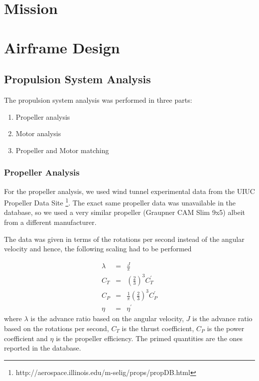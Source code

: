 \documentclass[11pt]{article}
\begin{document}
\section{Mission}
\label{Mission}

\section{Airframe Design}
\label{Vehicle}

\subsection{Propulsion System Analysis}

The propulsion system analysis was performed in three parts:
\begin{enumerate}
\item Propeller analysis
\item Motor analysis
\item Propeller and Motor matching
\end{enumerate}

\subsubsection{Propeller Analysis}

For the propeller analysis, we used wind tunnel experimental data from the UIUC Propeller Data Site \footnote{http://aerospace.illinois.edu/m-selig/props/propDB.html}. The exact same propeller data was unavailable in the database, so we used a very similar propeller (Graupner CAM Slim 9x5) albeit from a different manufacturer.

The data was given in terms of the rotations per second instead of the angular velocity and hence, the following scaling had to be performed

\begin{eqnarray*}
\lambda &=& \frac{J}{\pi} \\
C_T &=& \left( \frac{2}{3} \right)^3 C_T ^ \prime \\
C_P &=& \frac{1}{\pi} \left( \frac{2}{3} \right)^3 C_P ^ \prime \\
\eta &=& \eta ^ \prime
\end{eqnarray*}
where $\lambda$ is the advance ratio based on the angular velocity, $J$ is the advance ratio based on the rotations per second, $C_T$ is the thrust coefficient, $C_P$ is the power coefficient and $\eta$ is the propeller efficiency. The primed quantities are the ones reported in the database.
\end{document}
